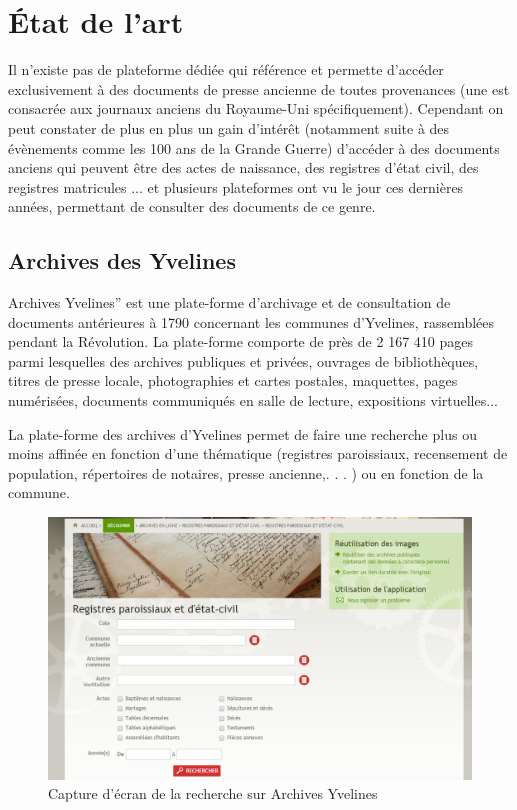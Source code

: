 \section{État de l'art}
\label{sec:etat_art}
    Il n’existe pas de plateforme dédiée qui référence et permette d’accéder exclusivement à des documents de presse ancienne de toutes
    provenances (une est consacrée aux journaux anciens du Royaume-Uni spécifiquement). Cependant
    on peut constater de plus en plus un gain d’intérêt (notamment suite à des évènements comme les 100 ans de la Grande Guerre)
    d’accéder à des documents anciens qui peuvent être des actes de naissance, des registres d’état civil, des registres matricules ...
    et plusieurs plateformes ont vu le jour ces dernières années, permettant de consulter des documents de ce genre.


        \subsection{Archives des Yvelines}
        \label{subsec:yvelines}
        Archives Yvelines” est une plate-forme d’archivage et de consultation de documents antérieures à 1790
        concernant les communes d’Yvelines, rassemblées pendant la Révolution. La plate-forme comporte de près
        de 2 167 410 pages parmi lesquelles des archives publiques et privées, ouvrages de bibliothèques, titres de presse locale,
        photographies et cartes postales, maquettes, pages numérisées, documents communiqués en salle de lecture, expositions virtuelles...

        La plate-forme des archives d’Yvelines permet de faire une recherche plus ou moins affinée en fonction d’une thématique
        (registres paroissiaux, recensement de population, répertoires de notaires, presse ancienne,. . . ) ou en fonction de la commune.

        \begin{figure}[ht!]
            \centering
            \includegraphics[width=1\textwidth]{figure/screen_yvelines_recherche.png}
            \caption{Capture d'écran de la recherche sur Archives Yvelines}
            \label{fig:yvelines_recherche}
        \end{figure}

